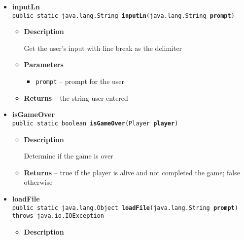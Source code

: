 {{{\begin{itemize}
{\begin{itemize}
{Check if the user's input is valid and return a valid data
}
\item{
{\bf  Parameters}
  \begin{itemize}
   \item{
\texttt{prompt} -- prompt for the user}
   \item{
\texttt{min} -- the minimum value for a valid data}
   \item{
\texttt{max} -- the maximum value for a valid data}
  \end{itemize}
}%
\item{{\bf  Returns} -- 
a valid integer data between min and max 
}%
\end{itemize}
}%
\item{ 
{\bf  inputLn}\\
\texttt{public static java.lang.String\ {\bf  inputLn}(\texttt{java.lang.String} {\bf  prompt})
\label{personOfInterest.Game.inputLn(java.lang.String)}}%
\begin{itemize}
\item{
{\bf  Description}

Get the user's input with line break as the delimiter
}
\item{
{\bf  Parameters}
  \begin{itemize}
   \item{
\texttt{prompt} -- prompt for the user}
  \end{itemize}
}%
\item{{\bf  Returns} -- 
the string user entered 
}%
\end{itemize}
}%
\item{ 
{\bf  isGameOver}\\
\texttt{public static boolean\ {\bf  isGameOver}(\texttt{Player} {\bf  player})
\label{personOfInterest.Game.isGameOver(personOfInterest.Player)}}%
\begin{itemize}
\item{
{\bf  Description}

Determine if the game is over
}
\item{{\bf  Returns} -- 
true if the player is alive and not completed the game; false otherwise 
}%
\end{itemize}
}%
\item{ 
{\bf  loadFile}\\
\texttt{public static java.lang.Object\ {\bf  loadFile}(\texttt{java.lang.String} {\bf  prompt}) throws java.io.IOException
\label{personOfInterest.Game.loadFile(java.lang.String)}}%
\begin{itemize}
\item{
{\bf  Description}

}
\end{itemize}}
\end{itemize}}}}
